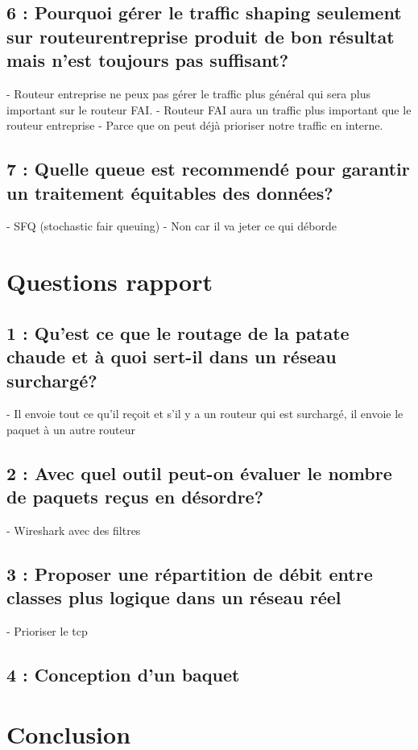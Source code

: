 \documentclass{article}
\begin{document}
\subsection*{6 : Pourquoi gérer le traffic shaping seulement sur routeurentreprise produit de bon résultat mais n'est toujours pas suffisant?}

- Routeur entreprise ne peux pas gérer le traffic plus général qui sera plus important sur le routeur FAI.
- Routeur FAI aura un traffic plus important que le routeur entreprise
- Parce que on peut déjà prioriser notre traffic en interne.

\subsection*{7 : Quelle queue est recommendé pour garantir un traitement équitables des données?}

- SFQ (stochastic fair queuing)
- Non car il va jeter ce qui déborde

\section{Questions rapport}

\subsection*{1 : Qu'est ce que le routage de la patate chaude et à quoi sert-il dans un réseau surchargé?}

- Il envoie tout ce qu'il reçoit et s'il y a un routeur qui est surchargé, il envoie le paquet à un autre routeur

\subsection*{2 : Avec quel outil peut-on évaluer le nombre de paquets reçus en désordre?}

- Wireshark avec des filtres

\subsection*{3 : Proposer une répartition de débit entre classes plus logique dans un réseau réel}

- Prioriser le tcp

\subsection*{4 : Conception d'un baquet}




\section{Conclusion}

\printbibliography
\end{document}
